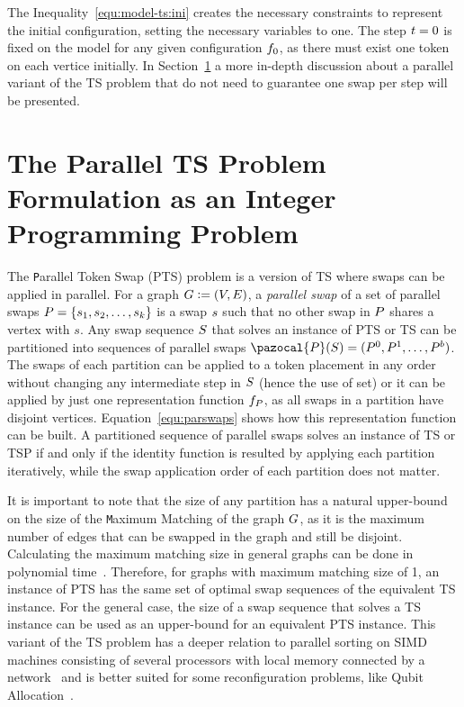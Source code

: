 \documentclass[msc,english,table,xcdraw]{ppgccufmg}
\begin{document}
The Inequality~\ref{equ:model-ts:ini} creates the necessary constraints
to represent the initial configuration, setting the necessary variables
to one.
The step $t = 0$ is fixed on the model for any given configuration
$f_{0}$, as there must exist one token on each vertice initially.
In Section~\ref{sec:formulation_pts} a more in-depth discussion about a 
parallel variant of the TS problem that do not need to guarantee one 
swap per step will be presented.

\section{The Parallel TS Problem Formulation as an Integer Programming Problem}
\label{sec:formulation_pts}

The {\texttt Parallel Token Swap} (PTS) problem is a version of TS where swaps can 
be applied in parallel.
For a graph $G \vcentcolon= (V, E)$, a \textit{parallel swap} of 
a set of parallel swaps $P = \{s_1, s_2, \ldots, 
s_k\}$ is a swap $s$ such that no other swap in $P$ shares a 
vertex with $s$.
Any swap sequence $S$ that solves an instance of PTS or TS can be 
partitioned into sequences of parallel swaps $\applyFunc{\pazocal{\swapPSeq}}{S} 
= (\swapPSeq^{0}, \swapPSeq^{1}, \ldots, \swapPSeq^{b})$.
The swaps of each partition can be applied to a token placement in any order 
without changing any intermediate step in $S$ (hence the use of set) or 
it can be applied by just one representation function $f_{P}$, as 
all swaps in a partition have disjoint vertices.
Equation~\ref{equ:parswaps} shows how this representation function can be built.
A partitioned sequence of parallel swaps solves an instance of TS or TSP if and 
only if the identity function is resulted by applying each partition 
iteratively, while the swap application order of each partition does not matter.


It is important to note that the size of any partition has a natural upper-bound 
on the size of the {\texttt Maximum Matching} of the graph $G$, as it is the
maximum number of edges that can be swapped in the graph and still be disjoint.
Calculating the maximum matching size in general graphs can be done in 
polynomial time~\citep{Edmonds:1965}.
Therefore, for graphs with maximum matching size of 1, an instance of PTS has the
same set of optimal swap sequences of the equivalent TS instance.
For the general case, the size of a swap sequence that solves a TS instance can be
used as an upper-bound for an equivalent PTS instance.
This variant of the TS problem has a deeper relation to parallel sorting on SIMD
machines consisting of several processors with local memory connected by a 
network~\citep{Yamanaka:2015,Kawahara:2017} and is better suited for some 
reconfiguration problems, like Qubit Allocation~\citep
{Siraichi:2018,Siraichi:2019}.
\end{document}
